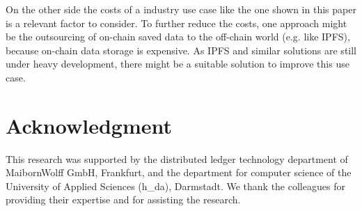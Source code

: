 \documentclass[conference]{IEEEtran}
\begin{document}
On the other side the costs of a industry use case like the one shown in this paper is a relevant factor to consider. To further reduce the costs, one approach might be the outsourcing of on-chain saved data to the off-chain world (e.g. like IPFS), because on-chain data storage is expensive. As IPFS and similar solutions are still under heavy development, there might be a suitable solution to improve this use case.


\section*{Acknowledgment}
This research was supported by the distributed ledger technology department of MaibornWolff GmbH, Frankfurt, and the department for computer science of the University of Applied Sciences (h\_da), Darmstadt. We thank the colleagues for providing their expertise and for assisting the research.
\end{document}
